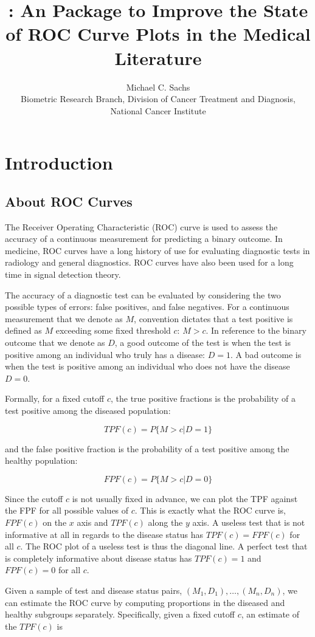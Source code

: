 \documentclass[article]{jss}
\author{		Michael C. Sachs\\Biometric Research Branch, Division of Cancer Treatment and Diagnosis,
National Cancer Institute		}
\title{\pkg{plotROC}: An \proglang{R} Package to Improve the State of ROC Curve
Plots in the Medical Literature}
\begin{document}
\section{Introduction}\label{introduction}

\subsection{About ROC Curves}\label{about-roc-curves}

The Receiver Operating Characteristic (ROC) curve is used to assess the
accuracy of a continuous measurement for predicting a binary outcome. In
medicine, ROC curves have a long history of use for evaluating
diagnostic tests in radiology and general diagnostics. ROC curves have
also been used for a long time in signal detection theory.

The accuracy of a diagnostic test can be evaluated by considering the
two possible types of errors: false positives, and false negatives. For
a continuous measurement that we denote as \(M\), convention dictates
that a test positive is defined as \(M\) exceeding some fixed threshold
\(c\): \(M > c\). In reference to the binary outcome that we denote as
\(D\), a good outcome of the test is when the test is positive among an
individual who truly has a disease: \(D = 1\). A bad outcome is when the
test is positive among an individual who does not have the disease
\(D = 0\).

Formally, for a fixed cutoff \(c\), the true positive fractions is the
probability of a test positive among the diseased population:

\[ TPF(c) = P\{ M > c | D = 1 \} \]

and the false positive fraction is the probability of a test positive
among the healthy population:

\[ FPF(c) = P\{ M > c | D = 0 \} \]

Since the cutoff \(c\) is not usually fixed in advance, we can plot the
TPF against the FPF for all possible values of \(c\). This is exactly
what the ROC curve is, \(FPF(c)\) on the \(x\) axis and \(TPF(c)\) along
the \(y\) axis. A useless test that is not informative at all in regards
to the disease status has \(TPF(c) = FPF(c)\) for all \(c\). The ROC
plot of a useless test is thus the diagonal line. A perfect test that is
completely informative about disease status has \(TPF(c) = 1\) and
\(FPF(c) = 0\) for all \(c\).

Given a sample of test and disease status pairs,
\((M_1, D_1), \ldots, (M_n, D_n)\), we can estimate the ROC curve by
computing proportions in the diseased and healthy subgroups separately.
Specifically, given a fixed cutoff \(c\), an estimate of the \(TPF(c)\)
is
\end{document}
